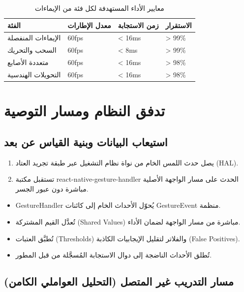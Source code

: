 \begin{Arabic}
\begin{table}[htbp]
\centering
\caption{معايير الأداء المستهدفة لكل فئة من الإيماءات}
\label{tab:performance-targets}
\begin{tabularx}{\textwidth}{XXXX}
\toprule
\textbf{الفئة} & \textbf{معدل الإطارات} & \textbf{زمن الاستجابة} & \textbf{الاستقرار} \\
\midrule
الإيماءات المنفصلة & 60fps & < 16ms & > 99\% \\
\rowcolor{gray!10}
السحب والتحريك & 60fps & < 8ms & > 99\% \\
متعددة الأصابع & 60fps & < 16ms & > 98\% \\
\rowcolor{gray!10}
التحويلات الهندسية & 60fps & < 16ms & > 98\% \\
\bottomrule
\end{tabularx}
\end{table}

\section{تدفق النظام ومسار التوصية}

\subsection{استيعاب البيانات وبنية القياس عن بعد}

\begin{enumerate}
    \item يصل حدث اللمس الخام من نواة نظام التشغيل عبر طبقة تجريد العتاد (\textenglish{HAL}).
    \item تستقبل مكتبة \textenglish{react-native-gesture-handler} الحدث على مسار الواجهة الأصلية مباشرة دون عبور الجسر.
\end{enumerate}

\begin{itemize}
    \item \textenglish{GestureHandler} يُحوّل الأحداث الخام إلى كائنات \textenglish{GestureEvent} منظمة.
    \item تُعدَّل القيم المشتركة (\textenglish{Shared Values}) مباشرة من مسار الواجهة لضمان الأداء.
    \item تُطبَّق العتبات (\textenglish{Thresholds}) والفلاتر لتقليل الإيجابيات الكاذبة (\textenglish{False Positives}).
    \item تُطلق الأحداث الناضجة إلى دوال الاستجابة المُسجَّلة من قبل المطور.
\end{itemize}

\subsection{مسار التدريب غير المتصل (التحليل العواملي الكامن)}


\end{Arabic}
